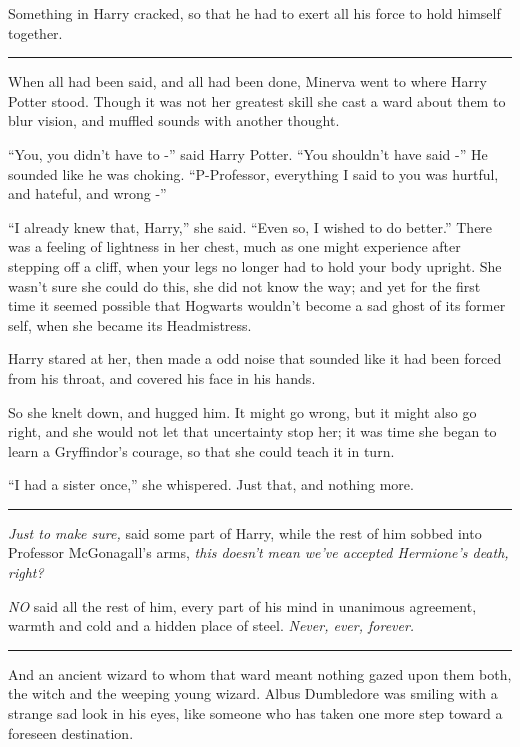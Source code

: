 Something in Harry cracked, so that he had to exert all his force to
hold himself together.

\begin{center}\rule{3in}{0.4pt}\end{center}

When all had been said, and all had been done, Minerva went to where
Harry Potter stood. Though it was not her greatest skill she cast a ward
about them to blur vision, and muffled sounds with another thought.

``You, you didn't have to -'' said Harry Potter. ``You shouldn't have
said -'' He sounded like he was choking. ``P-Professor, everything I
said to you was hurtful, and hateful, and wrong -''

``I already knew that, Harry,'' she said. ``Even so, I wished to do
better.'' There was a feeling of lightness in her chest, much as one
might experience after stepping off a cliff, when your legs no longer
had to hold your body upright. She wasn't sure she could do this, she
did not know the way; and yet for the first time it seemed possible that
Hogwarts wouldn't become a sad ghost of its former self, when she became
its Headmistress.

Harry stared at her, then made a odd noise that sounded like it had been
forced from his throat, and covered his face in his hands.

So she knelt down, and hugged him. It might go wrong, but it might also
go right, and she would not let that uncertainty stop her; it was time
she began to learn a Gryffindor's courage, so that she could teach it in
turn.

``I had a sister once,'' she whispered. Just that, and nothing more.

\begin{center}\rule{3in}{0.4pt}\end{center}

\emph{Just to make sure,} said some part of Harry, while the rest of him
sobbed into Professor McGonagall's arms, \emph{this doesn't mean we've
accepted Hermione's death, right?}

\emph{NO} said all the rest of him, every part of his mind in unanimous
agreement, warmth and cold and a hidden place of steel. \emph{Never,
ever, forever.}

\begin{center}\rule{3in}{0.4pt}\end{center}

And an ancient wizard to whom that ward meant nothing gazed upon them
both, the witch and the weeping young wizard. Albus Dumbledore was
smiling with a strange sad look in his eyes, like someone who has taken
one more step toward a foreseen destination.

